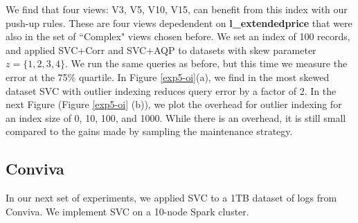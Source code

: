 We find that four views: V3, V5, V10, V15, can benefit from this index with our push-up rules. 
These are four views depedendent on \textbf{l\_extendedprice} that were also in the set of ``Complex" views chosen before.
We set an index of 100 records, and applied SVC+Corr and SVC+AQP to datasets with skew parameter $z=\{1,2,3,4\}$. 
We run the same queries as before, but this time we measure the error at the 75\% quartile.
In Figure \ref{exp5-oi}(a), we find in the most skewed dataset SVC with outlier indexing reduces query error by a factor of 2.
In the next Figure \big(Figure \ref{exp5-oi} (b)\big), we plot the overhead for outlier indexing for an index size of 0, 10, 100, and 1000.
While there is an overhead, it is still small compared to the gains made by sampling the maintenance strategy.

\subsection{Conviva}
In our next set of experiments, we applied SVC to a 1TB dataset of logs from Conviva.
We implement SVC on a 10-node Spark cluster. 


